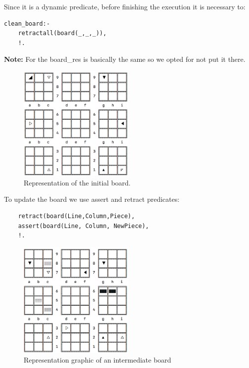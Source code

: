 \documentclass[a4paper]{article}
\begin{document}
Since it is a dynamic predicate, before finishing the execution it is necessary to:

\begin{verbatim}
clean_board:-
    retractall(board(_,_,_)),
    !.
\end{verbatim}


\textbf{Note:} For the board\_res is basically the same so we opted for not put it there.


\begin{figure}[H]
    \centering
    \includegraphics[width=0.5\textwidth]{Imagem1.png}
    \caption{Representation of the initial board.}
    \label{fig:initial-state}
\end{figure}

To update the board we use assert and retract predicates:
\begin{verbatim}
    retract(board(Line,Column,Piece),
    assert(board(Line, Column, NewPiece),
    !.
\end{verbatim}



\begin{figure}[H]
    \centering
    \includegraphics[width=0.5\textwidth]{Imagem2.png}
    \caption{Representation graphic of an intermediate board}
    \label{fig:intermediate-state}
\end{figure}
\end{document}
